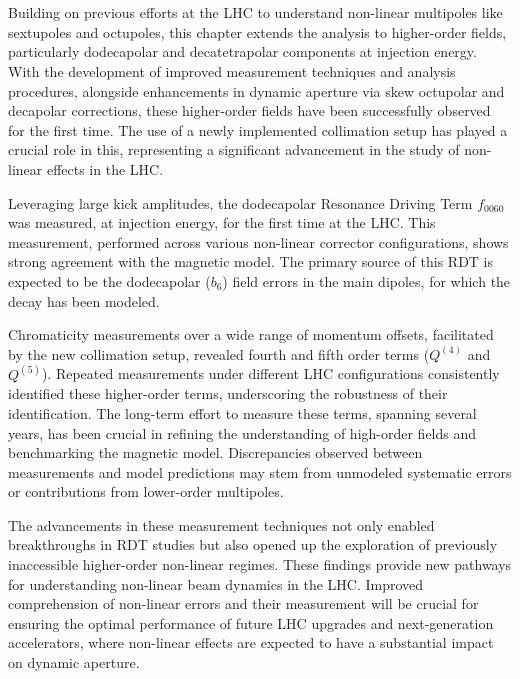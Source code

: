 \section{}


Building on previous efforts at the LHC to understand non-linear multipoles like
sextupoles and octupoles, this chapter extends the analysis to higher-order fields, particularly
dodecapolar and decatetrapolar components at injection energy. With the development of improved
measurement techniques and analysis procedures, alongside enhancements in dynamic aperture via skew
octupolar and decapolar corrections, these higher-order fields have been successfully observed for
the first time. The use of a newly implemented collimation setup has played a crucial role in this,
representing a significant advancement in the study of non-linear effects in the LHC.

Leveraging large kick amplitudes, the dodecapolar Resonance Driving Term $f_{0060}$ was measured, at
injection energy, for the first time at the LHC. This measurement, performed across various
non-linear corrector configurations, shows strong agreement with the magnetic model. The primary
source of this RDT is expected to be the dodecapolar ($b_6$) field errors in the main dipoles,
for which the decay has been modeled.

Chromaticity measurements over a wide range of momentum offsets, facilitated by the new collimation
setup, revealed fourth and fifth order terms ($Q^{(4)}$ and $Q^{(5)}$). Repeated measurements
under different LHC configurations consistently identified these higher-order terms, underscoring
the robustness of their identification. The long-term effort to measure these terms, spanning
several years, has been crucial in refining the understanding of high-order fields and
benchmarking the magnetic model. Discrepancies observed between measurements and model predictions
may stem from unmodeled systematic errors or contributions from lower-order multipoles.

The advancements in these measurement techniques not only enabled breakthroughs in RDT studies but
also opened up the exploration of previously inaccessible higher-order non-linear regimes. These
findings provide new pathways for understanding non-linear beam dynamics in the LHC. Improved
comprehension of non-linear errors and their measurement will be crucial for ensuring the optimal
performance of future LHC upgrades and next-generation accelerators, where non-linear effects are
expected to have a substantial impact on dynamic aperture.